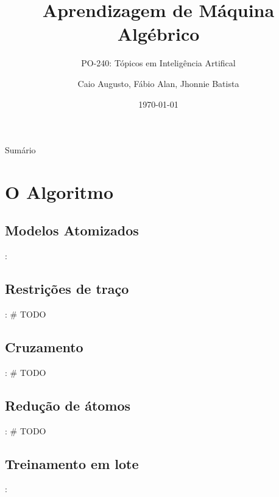 \documentclass{beamer}
\title[AM Algébrico]{Aprendizagem de Máquina Algébrico}
\subtitle{PO-240: Tópicos em Inteligência Artifical}
\institute{ITA}
\author[Caio, Fábio, Jhonnie]{Caio Augusto, Fábio Alan, Jhonnie Batista}
\date{\today}
\begin{document}

\begin{frame}
    \titlepage
\end{frame}

\begin{frame}{Sumário}
    \setcounter{tocdepth}{2}
    \tableofcontents
\end{frame}





\section{O Algoritmo}


\subsection{Modelos Atomizados}
\begin{frame}{\secname : \subsecname}
    \lipsum[2]
\end{frame}
\subsection{Restrições de traço}
\begin{frame}{\secname : \subsecname}
    \# TODO
\end{frame}
\subsection{Cruzamento}
\begin{frame}{\secname : \subsecname}
    \# TODO
\end{frame}
\subsection{Redução de átomos}
\begin{frame}{\secname : \subsecname}
    \# TODO
\end{frame}
\subsection{Treinamento em lote}
\begin{frame}{\secname : \subsecname}
    \lipsum[3]
\end{frame}
\end{document}
